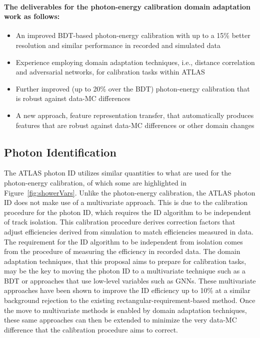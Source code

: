 \documentclass[letter, USenglish, 11pt, subfigure]{article}
\begin{document}
\paragraph{The deliverables for the photon-energy calibration domain adaptation work as follows:}
\begin{itemize}
\item An improved BDT-based photon-energy calibration with up to a 15\% better resolution and similar performance in recorded and simulated data
\item Experience employing domain adaptation techniques, i.e., distance correlation and adversarial networks, for calibration tasks within ATLAS
\item Further improved (up to 20\% over the BDT) photon-energy calibration that is robust against data-MC differences
\item A new approach, feature representation transfer, that automatically produces features that are robust against data-MC differences or other domain changes
\end{itemize}

\subsection{Photon Identification}

The ATLAS photon ID utilizes similar quantities to what are used for the photon-energy calibration, of which some are highlighted in Figure~\ref{fig:showerVars}. Unlike the photon-energy calibration, the ATLAS photon ID does not make use of a multivariate approach. This is due to the calibration procedure for the photon ID, which requires the ID algorithm to be independent of track isolation. This calibration procedure derives correction factors that adjust efficiencies derived from simulation to match efficiencies measured in data. The requirement for the ID algorithm to be independent from isolation comes from the procedure of measuring the efficiency in recorded data. The domain adaptation techniques, that this proposal aims to prepare for calibration tasks, may be the key to moving the photon ID to a multivariate technique such as a BDT or approaches that use low-level variables such as GNNs. These multivariate approaches have been shown to improve the ID efficiency up to 10\% at a similar background rejection to the existing rectangular-requirement-based method. Once the move to multivariate methods is enabled by domain adaptation techniques, these same approaches can then be extended to minimize the very data-MC difference that the calibration procedure aims to correct.
\end{document}
